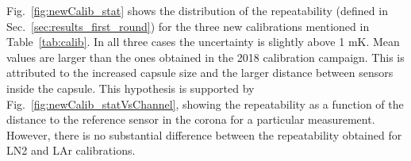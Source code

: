 Fig.~\ref{fig:newCalib_stat} shows the distribution of the repeatability (defined in Sec.~\ref{sec:results_first_round}) for the three new calibrations mentioned in Table~\ref{tab:calib}. In all three cases the uncertainty is slightly above 1 mK. Mean values are larger than the ones obtained in the 2018 calibration campaign. This is attributed to the increased capsule size and the larger distance between sensors inside the capsule. This hypothesis is supported by Fig.~\ref{fig:newCalib_statVsChannel}, showing the repeatability as a function of the distance to the reference sensor in the corona for a particular measurement. However, there is no substantial difference between the repeatability obtained for LN2 and LAr calibrations.



